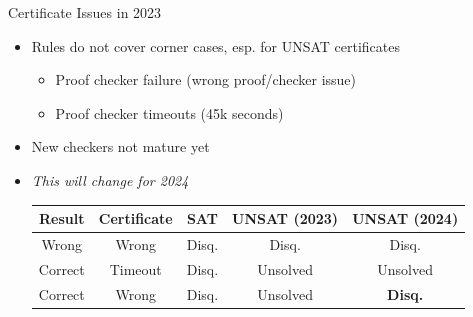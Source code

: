 \documentclass{beamer}
\begin{document}
\begin{frame}{Certificate Issues in 2023}
\centering

\begin{itemize}\setlength\itemsep{1em}
	\item Rules do not cover corner cases, esp. for UNSAT certificates
	\begin{itemize}
		\item Proof checker failure (wrong proof/checker issue)
		\item Proof checker timeouts (45k seconds)
	\end{itemize}
	\item New checkers not mature yet
	\item \emph{This will change for 2024}\\[1em]
\begin{tabular}{@{}cc|ccc}
\toprule
Result & Certificate & SAT & UNSAT (2023) & UNSAT (2024) \\ \midrule
Wrong & Wrong & Disq. & Disq. & Disq. \\
Correct & Timeout & Disq. & Unsolved & Unsolved \\
Correct & Wrong & Disq. & Unsolved & \bf Disq. \\
\bottomrule
\end{tabular}
\end{itemize}
\end{frame}

\end{document}
